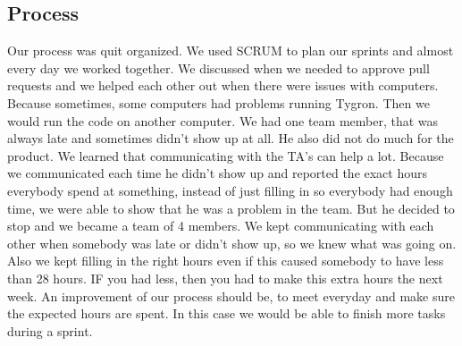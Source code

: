 \subsection{Process}
Our process was quit organized. We used SCRUM to plan our sprints and almost every day we worked together. We discussed when we needed to approve pull requests and we helped each other out when there were issues with computers. Because sometimes, some computers had problems running Tygron. Then we would run the code on another computer. We had one team member, that was always late and sometimes didn't show up at all. He also did not do much for the product. We learned that communicating with the TA's can help a lot. Because we communicated each time he didn't show up and reported the exact hours everybody spend at something, instead of just filling in so everybody had enough time, we were able to show that he was a problem in the team. But he decided to stop and we became a team of 4 members. We kept communicating with each other when somebody was late or didn't show up, so we knew what was going on. Also we kept filling in the right hours even if this caused somebody to have less than 28 hours. IF you had less, then you had to make this extra hours the next week.
An improvement of our process should be, to meet everyday and make sure the expected hours are spent. In this case we would be able to finish more tasks during a sprint.
	